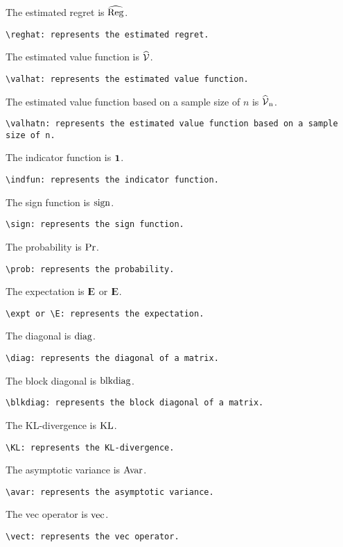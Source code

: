 \documentclass{article}
\begin{document}
The estimated regret is $\widehat{\operatorname{\rm Reg}}$.
\begin{verbatim}
\reghat: represents the estimated regret.
\end{verbatim}

The estimated value function is $\operatorname{{\widehat{\operatorname{{\mathcal{V} }}}}}$.
\begin{verbatim}
\valhat: represents the estimated value function.
\end{verbatim}

The estimated value function based on a sample size of $n$ is $\operatorname{{\widehat{\operatorname{{\mathcal{V} }}}}_{n}}$.
\begin{verbatim}
\valhatn: represents the estimated value function based on a sample size of n.
\end{verbatim}

The indicator function is $\operatorname{{\boldsymbol{1}}}$.
\begin{verbatim}
\indfun: represents the indicator function.
\end{verbatim}

The sign function is $\operatorname{sign}$.
\begin{verbatim}
\sign: represents the sign function.
\end{verbatim}

The probability is $\operatorname{{\mathrm{Pr}}}$.
\begin{verbatim}
\prob: represents the probability.
\end{verbatim}

The expectation is $\operatorname{{\rm I\kern-.3em E}}$ or $\operatorname{\operatorname{{\rm I\kern-.3em E}}}$.
\begin{verbatim}
\expt or \E: represents the expectation.
\end{verbatim}

The diagonal is $\operatorname{diag}$.
\begin{verbatim}
\diag: represents the diagonal of a matrix.
\end{verbatim}

The block diagonal is $\operatorname{blkdiag}$.
\begin{verbatim}
\blkdiag: represents the block diagonal of a matrix.
\end{verbatim}

The KL-divergence is $\operatorname{\rm KL}$.
\begin{verbatim}
\KL: represents the KL-divergence.
\end{verbatim}

The asymptotic variance is $\operatorname{{\mathrm{Avar}}}$.
\begin{verbatim}
\avar: represents the asymptotic variance.
\end{verbatim}

The vec operator is $\operatorname{vec}$.
\begin{verbatim}
\vect: represents the vec operator.
\end{verbatim}
\end{document}
